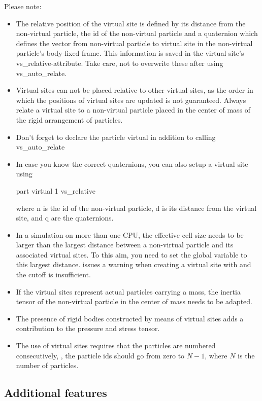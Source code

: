 Please note:
\begin{itemize}
\item The relative position of the virtual site is defined by its
  distance from the non-virtual particle, the id of the non-virtual
  particle and a quaternion which defines the vector from non-virtual
  particle to virtual site in the non-virtual particle's body-fixed
  frame. This information is saved in the virtual site's
  vs\_relative-attribute. Take care, not to overwrite these after using
  vs\_auto\_relate.
\item Virtual sites can not be placed relative to other virtual sites,
  as the order in which the positions of virtual sites are updated is
  not guaranteed. Always relate a virtual site to a non-virtual
  particle placed in the center of mass of the rigid arrangement of
  particles.
\item Don't forget to declare the particle virtual in addition to
  calling vs\_auto\_relate
\item In case you know the correct quaternions, you can also setup a
  virtual site using
  \begin{essyntaxbox}
    part  virtual 1 vs_relative   
  \end{essyntaxbox}
  where n is the id of the non-virtual particle, d is its distance
  from the virtual site, and q are the quaternions.
\item In a simulation on more than one CPU, the effective cell size
  needs to be larger than the largest distance between a non-virtual
  particle and its associated virtual sites. To this aim, you need to
  set the global variable  to this largest
  distance. \es issues a warning when creating a virtual site with
   and the cutoff is insufficient.
\item If the virtual sites represent actual particles carrying a mass,
  the inertia tensor of the non-virtual particle in the center of mass
  needs to be adapted.
\item The presence of rigid bodies constructed by means of virtual
  sites adds a contribution to the pressure and stress tensor.
\item The use of virtual sites requires that the particles are
  numbered consecutively, \ie, the particle ids should go from zero to
  $N-1$, where $N$ is the number of particles.
\end{itemize}

\subsection{Additional features}

